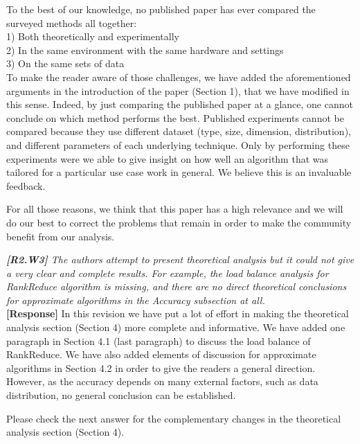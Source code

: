 \documentclass[11pt]{letter}
\newcommand{\svs}{\vspace{0.36ex}}
\newcommand{\TODO}[1]{\textcolor{red}{\textbf{[TODO:#1]}}}
\begin{document}
To the best of our knowledge, no published paper has ever compared the surveyed methods all together:\\
1) Both theoretically and experimentally\\
2) In the same environment with the same hardware and settings\\
3) On the same sets of data\\
To make the reader aware of those challenges, we have added the aforementioned arguments in the introduction of the paper (Section 1), that we have modified in this sense.
Indeed, by just comparing the published paper at a glance, one cannot conclude on which method performs the best. 
Published experiments cannot be compared because they use different dataset (type, size, dimension, distribution), 
 and different parameters of each underlying technique.   
Only by performing these experiments were we able to give insight on how well an algorithm that was tailored for a 
particular use case work in general. We believe this is an invaluable feedback. 

For all those reasons, we think that this paper has a high relevance and we will do our best to correct the problems 
that remain in order to make the community benefit from our analysis.

\svs
\noindent
{\em
{\bf [R2.W3]}
The authors attempt to present theoretical analysis but it could not give
a very clear and complete results. For example, the load balance analysis for
RankReduce algorithm is missing, and there are no direct theoretical
conclusions for approximate algorithms in the Accuracy subsection at all.}\\
\textbf{[Response]} In this revision we have put a lot of effort in making the theoretical analysis section (Section 4) 
more complete and informative. We have added one paragraph in Section 4.1 (last paragraph) to discuss the load 
balance of RankReduce. We have also added elements of discussion for approximate algorithms in 
Section 4.2 in order to give the readers a general direction. However, as the accuracy depends on many external 
factors, such as data distribution, no general conclusion can be established.

Please check the next answer for the complementary changes in the theoretical analysis section (Section 4).
%
\end{document}
